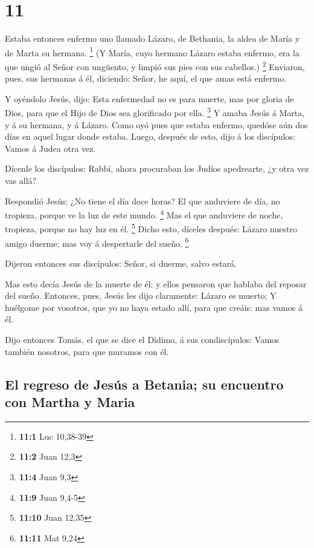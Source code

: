 \hypertarget{section-10}{%
\section{11}\label{section-10}}

 Estaba entonces enfermo uno llamado Lázaro, de Bethania,
la aldea de María y de Marta su hermana. \footnote{\textbf{11:1} Luc
  10,38-39}  (Y María, cuyo hermano Lázaro estaba enfermo,
era la que ungió al Señor con ungüento, y limpió sus pies con sus
cabellos.) \footnote{\textbf{11:2} Juan 12,3}  Enviaron,
pues, sus hermanas á él, diciendo: Señor, he aquí, el que amas está
enfermo.

 Y oyéndolo Jesús, dijo: Esta enfermedad no es para
muerte, mas por gloria de Dios, para que el Hijo de Dios sea glorificado
por ella. \footnote{\textbf{11:4} Juan 9,3}  Y amaba Jesús
á Marta, y á su hermana, y á Lázaro.  Como oyó pues que
estaba enfermo, quedóse aún dos días en aquel lugar donde estaba.
 Luego, después de esto, dijo á los discípulos: Vamos á
Judea otra vez.

 Dícenle los discípulos: Rabbí, ahora procuraban los
Judíos apedrearte, ¿y otra vez vas allá?

 Respondió Jesús: ¿No tiene el día doce horas? El que
anduviere de día, no tropieza, porque ve la luz de este mundo.
\footnote{\textbf{11:9} Juan 9,4-5}  Mas el que anduviere
de noche, tropieza, porque no hay luz en él. \footnote{\textbf{11:10}
  Juan 12,35}  Dicho esto, díceles después: Lázaro
nuestro amigo duerme; mas voy á despertarle del sueño. \footnote{\textbf{11:11}
  Mat 9,24}

 Dijeron entonces sus discípulos: Señor, si duerme, salvo
estará.

 Mas esto decía Jesús de la muerte de él: y ellos
pensaron que hablaba del reposar del sueño.  Entonces,
pues, Jesús les dijo claramente: Lázaro es muerto;  Y
huélgome por vosotros, que yo no haya estado allí, para que creáis: mas
vamos á él.

 Dijo entonces Tomás, el que se dice el Dídimo, á sus
condiscípulos: Vamos también nosotros, para que muramos con él.

\hypertarget{el-regreso-de-jesuxfas-a-betania-su-encuentro-con-martha-y-maria}{%
\subsection{El regreso de Jesús a Betania; su encuentro con Martha y
Maria}\label{el-regreso-de-jesuxfas-a-betania-su-encuentro-con-martha-y-maria}}


